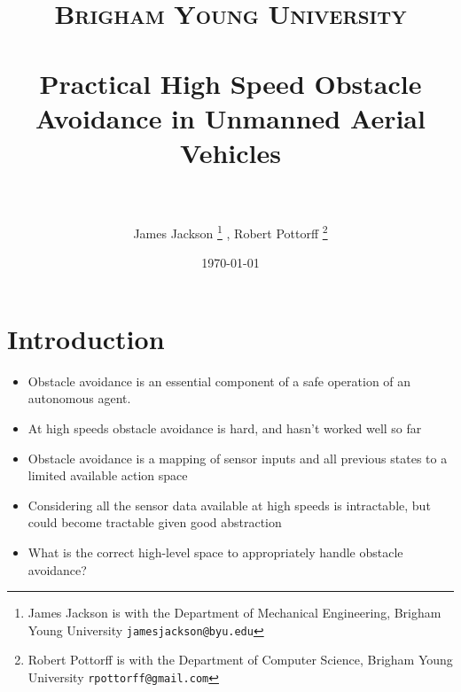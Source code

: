 \documentclass[paper=a4, fontsize=11pt]{scrartcl} %
\title{
\normalfont \normalsize
\textsc{Brigham Young University} \\ [25pt] %
\horrule{0.5pt} \\[0.4cm] %
\huge Practical High Speed Obstacle Avoidance in Unmanned Aerial Vehicles\\ %
\horrule{2pt} \\[0.5cm] %
}
\author{James Jackson%
\thanks{James Jackson is with the Department of Mechanical Engineering, Brigham Young University
        {\tt\small jamesjackson@byu.edu}}%
        , Robert Pottorff
\thanks{Robert Pottorff is with the Department of Computer Science, Brigham Young University
        {\tt\small rpottorff@gmail.com}}%
}
\date{\normalsize\today} %
\begin{document}
\maketitle %


\section{Introduction}

\begin{itemize}
	\item Obstacle avoidance is an essential component of a safe operation of an autonomous agent.
	\item At high speeds obstacle avoidance is hard, and hasn't worked well so far
\end{itemize}
	
\begin{itemize}
	\item Obstacle avoidance is a mapping of sensor inputs and all previous states to a limited available action space
	\item Considering all the sensor data available at high speeds is intractable, but could become tractable given good abstraction
	\item What is the correct high-level space to appropriately handle obstacle avoidance?
\end{itemize}
	
\end{document}
